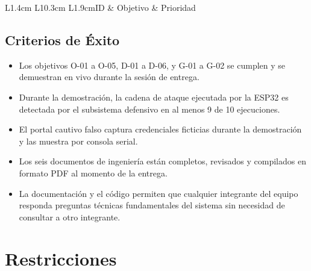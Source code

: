 \documentclass[11pt,a4paper]{article}
\begin{document}
\begin{datatable}{L{1.4cm} L{10.3cm} L{1.9cm}}{ID & Objetivo & Prioridad}
\end{datatable}

\subsection{Criterios de Éxito}
\begin{itemize}
  \item Los objetivos O-01 a O-05, D-01 a D-06, y G-01 a G-02 se cumplen y
    se demuestran en vivo durante la sesión de entrega.
  \item Durante la demostración, la cadena de ataque ejecutada por la ESP32
    es detectada por el subsistema defensivo en al menos 9 de 10 ejecuciones.
  \item El portal cautivo falso captura credenciales ficticias durante la
    demostración y las muestra por consola serial.
  \item Los seis documentos de ingeniería están completos, revisados y
    compilados en formato PDF al momento de la entrega.
  \item La documentación y el código permiten que cualquier integrante del
    equipo responda preguntas técnicas fundamentales del sistema sin
    necesidad de consultar a otro integrante.
\end{itemize}

\section{Restricciones}
\end{document}
